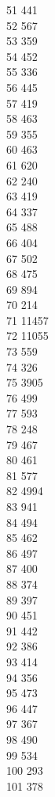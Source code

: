 { 51	441 \\
 52	567 \\
 53	359 \\
 54	452 \\
 55	336 \\
 56	445 \\
 57	419 \\
 58	463 \\
 59	355 \\
 60	463 \\
 61	620 \\
 62	240 \\
 63	419 \\
 64	337 \\
 65	488 \\
 66	404 \\
 67	502 \\
 68	475 \\
 69	894 \\
 70	214 \\
 71	11457 \\
 72	11055 \\
 73	559 \\
 74	326 \\
 75	3905 \\
 76	499 \\
 77	593 \\
 78	248 \\
 79	467 \\
 80	461 \\
 81	577 \\
 82	4994 \\
 83	941 \\
 84	494 \\
 85	462 \\
 86	497 \\
 87	400 \\
 88	374 \\
 89	397 \\
 90	451 \\
 91	442 \\
 92	386 \\
 93	414 \\
 94	356 \\
 95	473 \\
 96	447 \\
 97	367 \\
 98	490 \\
 99	534 \\
 100	293 \\
 101	378 \\
}
